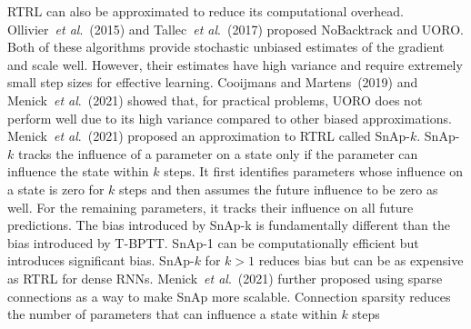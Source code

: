 \documentclass{article}
\newcommand{\etal}{\textit{et al}.}
\begin{document}
RTRL can also be approximated to reduce its computational overhead. Ollivier~\etal~(2015) and Tallec~\etal~(2017) proposed NoBacktrack and UORO. Both of these algorithms provide stochastic unbiased estimates of the gradient and scale well. However, their estimates have high variance and require extremely small step sizes for effective learning. Cooijmans and Martens~(2019) and Menick~\etal~(2021) showed that, for practical problems, UORO does not perform well due to its high variance compared to other biased approximations. Menick~\etal~(2021) proposed an approximation to RTRL called SnAp-$k$. SnAp-$k$ tracks the influence of a parameter on a state only if the parameter can influence the state within $k$ steps. It first identifies parameters whose influence on a state is zero for $k$ steps and then assumes the future influence to be zero as well. For the remaining parameters, it tracks their influence on all future predictions. The bias introduced by SnAp-k is fundamentally different than the bias introduced by T-BPTT. SnAp-1 can be computationally efficient but introduces significant bias. SnAp-$k$ for $k>1$ reduces bias but can be as expensive as RTRL for dense RNNs.  Menick~\etal~(2021) further proposed using sparse connections as a way to make SnAp more scalable. Connection sparsity reduces the number of parameters that can influence a state within $k$ steps

\end{document}
